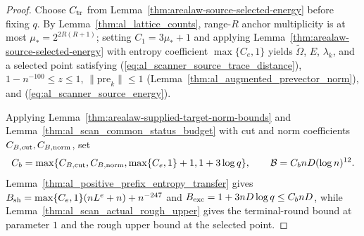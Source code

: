 \begin{proof}
    \leanok
    Choose $C_{\rm tr}$ from Lemma~\ref{thm:arealaw-source-selected-energy} before fixing $q$.
    By Lemma~\ref{thm:al_lattice_counts}, range-$R$ anchor multiplicity is at most $\mu_*=2^{2R(R+1)}$; setting $C_1=3\mu_*+1$ and applying Lemma~\ref{thm:arealaw-source-selected-energy} with entropy coefficient $\max\{C_e,1\}$ yields $\widetilde\Omega$, $E$, $\lambda_k$, and a selected point satisfying (\ref{eq:al_scanner_source_trace_distance}), $1-n^{-100}\le z\le1$, $\|\mathrm{pre}_k\|\le1$ (Lemma~\ref{thm:al_augmented_prevector_norm}), and (\ref{eq:al_scanner_source_energy}).

    Applying Lemma~\ref{thm:arealaw-supplied-target-norm-bounds} and Lemma~\ref{thm:al_scan_common_status_budget} with cut and norm coefficients $C_{B,\rm cut},C_{B,\rm norm}$, set
    \begin{align}
        C_b        =\max\{C_{B,\rm cut},C_{B,\rm norm},
        \max\{C_e,1\}+1,1+3\log q\},\qquad
        \mathcal B =C_bnD(\log n)^{12}. \notag
    \end{align}
    Lemma~\ref{thm:al_positive_prefix_entropy_transfer} gives $B_{\rm sh}=\max\{C_e,1\}(nL^e+n)+n^{-247}$ and $B_{\rm exc}=1+3nD\log q\le C_bnD$, while Lemma~\ref{thm:al_scan_actual_rough_upper} gives the terminal-round bound at parameter $1$ and the rough upper bound at the selected point.
\end{proof}
